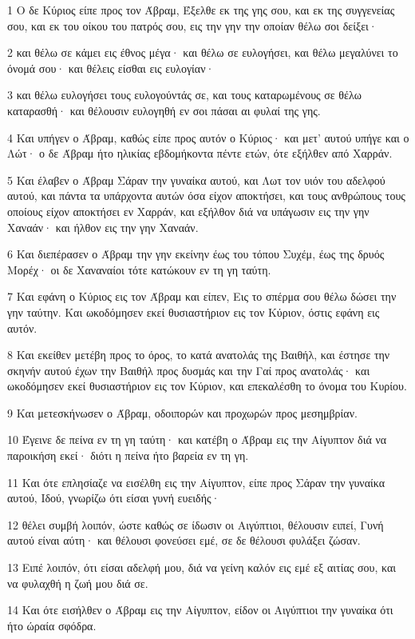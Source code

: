 \par 1 Ο δε Κύριος είπε προς τον Άβραμ, Έξελθε εκ της γης σου, και εκ της συγγενείας σου, και εκ του οίκου του πατρός σου, εις την γην την οποίαν θέλω σοι δείξει·
\par 2 και θέλω σε κάμει εις έθνος μέγα· και θέλω σε ευλογήσει, και θέλω μεγαλύνει το όνομά σου· και θέλεις είσθαι εις ευλογίαν·
\par 3 και θέλω ευλογήσει τους ευλογούντάς σε, και τους καταρωμένους σε θέλω καταρασθή· και θέλουσιν ευλογηθή εν σοι πάσαι αι φυλαί της γης.
\par 4 Και υπήγεν ο Άβραμ, καθώς είπε προς αυτόν ο Κύριος· και μετ' αυτού υπήγε και ο Λώτ· ο δε Άβραμ ήτο ηλικίας εβδομήκοντα πέντε ετών, ότε εξήλθεν από Χαρράν.
\par 5 Και έλαβεν ο Άβραμ Σάραν την γυναίκα αυτού, και Λωτ τον υιόν του αδελφού αυτού, και πάντα τα υπάρχοντα αυτών όσα είχον αποκτήσει, και τους ανθρώπους τους οποίους είχον αποκτήσει εν Χαρράν, και εξήλθον διά να υπάγωσιν εις την γην Χαναάν· και ήλθον εις την γην Χαναάν.
\par 6 Και διεπέρασεν ο Άβραμ την γην εκείνην έως του τόπου Συχέμ, έως της δρυός Μορέχ· οι δε Χαναναίοι τότε κατώκουν εν τη γη ταύτη.
\par 7 Και εφάνη ο Κύριος εις τον Άβραμ και είπεν, Εις το σπέρμα σου θέλω δώσει την γην ταύτην. Και ωκοδόμησεν εκεί θυσιαστήριον εις τον Κύριον, όστις εφάνη εις αυτόν.
\par 8 Και εκείθεν μετέβη προς το όρος, το κατά ανατολάς της Βαιθήλ, και έστησε την σκηνήν αυτού έχων την Βαιθήλ προς δυσμάς και την Γαί προς ανατολάς· και ωκοδόμησεν εκεί θυσιαστήριον εις τον Κύριον, και επεκαλέσθη το όνομα του Κυρίου.
\par 9 Και μετεσκήνωσεν ο Άβραμ, οδοιπορών και προχωρών προς μεσημβρίαν.
\par 10 Έγεινε δε πείνα εν τη γη ταύτη· και κατέβη ο Άβραμ εις την Αίγυπτον διά να παροικήση εκεί· διότι η πείνα ήτο βαρεία εν τη γη.
\par 11 Και ότε επλησίαζε να εισέλθη εις την Αίγυπτον, είπε προς Σάραν την γυναίκα αυτού, Ιδού, γνωρίζω ότι είσαι γυνή ευειδής·
\par 12 θέλει συμβή λοιπόν, ώστε καθώς σε ίδωσιν οι Αιγύπτιοι, θέλουσιν ειπεί, Γυνή αυτού είναι αύτη· και θέλουσι φονεύσει εμέ, σε δε θέλουσι φυλάξει ζώσαν.
\par 13 Ειπέ λοιπόν, ότι είσαι αδελφή μου, διά να γείνη καλόν εις εμέ εξ αιτίας σου, και να φυλαχθή η ζωή μου διά σε.
\par 14 Και ότε εισήλθεν ο Άβραμ εις την Αίγυπτον, είδον οι Αιγύπτιοι την γυναίκα ότι ήτο ώραία σφόδρα.
